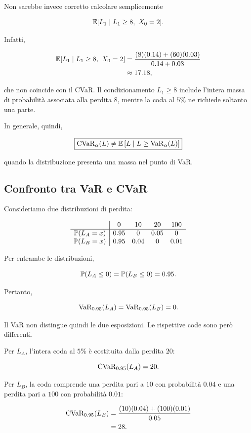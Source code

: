 Non sarebbe invece corretto calcolare semplicemente

\[
\E[L_1\mid L_1\geq8,\ X_0=2].
\]

Infatti,

\[
\begin{split}
\mathbb{E}[L_1\mid L_1\geq8,\ X_0=2]
&=
\frac{
(8)(0.14)+(60)(0.03)
}{
0.14+0.03
}
\\
&\approx
17.18,
\end{split}
\]

che non coincide con il CVaR. Il condizionamento $L_1\geq8$ include
l'intera massa di probabilit\`{a} associata alla perdita $8$, mentre
la coda al $5\%$ ne richiede soltanto una parte.

In generale, quindi,

\[
\boxed{
\operatorname{CVaR}_{\alpha}(L)
\neq
\mathbb{E}
\left[
L\mid L\geq\operatorname{VaR}_{\alpha}(L)
\right]
}
\]

quando la distribuzione presenta una massa nel punto di VaR.

\subsection{Confronto tra VaR e CVaR}

\label{subsec:cap9-confronto-var-cvar}

Consideriamo due distribuzioni di perdita:

\[
\begin{array}{c|cccc}
&
0
&
10
&
20
&
100
\\
\hline
\mathbb{P}(L_A=x)
&
0.95
&
0
&
0.05
&
0
\\
\mathbb{P}(L_B=x)
&
0.95
&
0.04
&
0
&
0.01
\end{array}
\]

Per entrambe le distribuzioni,

\[
\mathbb{P}(L_A\leq0)
=
\mathbb{P}(L_B\leq0)
=
0.95.
\]

Pertanto,

\[
\operatorname{VaR}_{0.95}(L_A)
=
\operatorname{VaR}_{0.95}(L_B)
=
0.
\]

Il VaR non distingue quindi le due esposizioni. Le rispettive code
sono per\`{o} differenti.

Per $L_A$, l'intera coda al $5\%$ \`{e} costituita dalla perdita $20$:

\[
\operatorname{CVaR}_{0.95}(L_A)
=
20.
\]

Per $L_B$, la coda comprende una perdita pari a $10$ con probabilit\`{a}
$0.04$ e una perdita pari a $100$ con probabilit\`{a} $0.01$:

\[
\begin{split}
\operatorname{CVaR}_{0.95}(L_B)
&=
\frac{
(10)(0.04)+(100)(0.01)
}{
0.05
}
\\
&=
28.
\end{split}
\]

